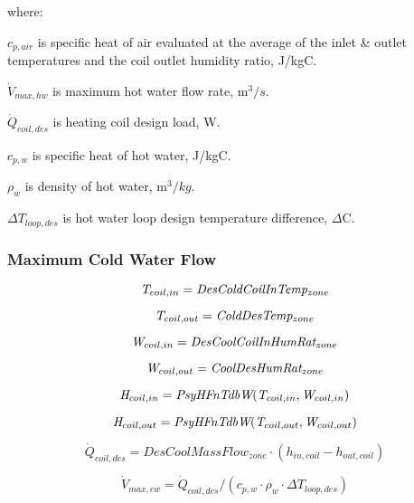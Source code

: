 where:

\(c_{p,air}\) is specific heat of air evaluated at the average of the inlet \& outlet temperatures and the coil outlet humidity ratio, J/kgC.

\(\dot{V}_{max,hw}\) is maximum hot water flow rate, m$^{3}/s$.

\(\dot{Q}_{coil,des}\) is heating coil design load, W.

\(c_{p,w}\) is specific heat of hot water, J/kgC.

\(\rho_{w}\) is density of hot water, m$^{3}/kg$.

\(\Delta T_{loop,des}\) is hot water loop design temperature difference, \(\Delta\)C.


\subsubsection{Maximum Cold Water Flow}\label{maximum-cold-water-flow}

\begin{equation}
\emph{T\(_{coil,in}\)} = \emph{DesColdCoilInTemp\(_{zone}\)}
\end{equation}

\begin{equation}
\emph{T\(_{coil,out}\)} = \emph{ColdDesTemp\(_{zone}\)}
\end{equation}

\begin{equation}
\emph{W\(_{coil,in}\)} = \emph{DesCoolCoilInHumRat\(_{zone}\)}
\end{equation}

\begin{equation}
\emph{W\(_{coil,out}\)} = \emph{CoolDesHumRat\(_{zone}\)}
\end{equation}

\begin{equation}
\emph{H\(_{coil,in}\)} = \emph{PsyHFnTdbW}(\emph{T\(_{coil,in}\)}, \emph{W\(_{coil,in}\)})
\end{equation}

\begin{equation}
\emph{H\(_{coil,out}\)} = \emph{PsyHFnTdbW}(\emph{T\(_{coil,out}\)}, \emph{W\(_{coil,out}\)})
\end{equation}

\begin{equation}
\dot{Q}_{coil,des} = DesCoolMassFlow_{zone} \cdot (h_{in,coil} - h_{out,coil})
\end{equation}

\begin{equation}
\dot{V}_{max,cw} = \dot{Q}_{coil,des} / (c_{p,w} \cdot \rho_w \cdot \Delta T_{loop,des})
\end{equation}

